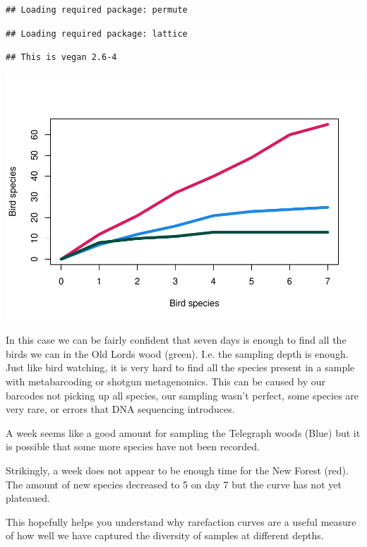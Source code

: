\documentclass[
]{book}
\begin{document}
\begin{verbatim}
## Loading required package: permute
\end{verbatim}

\begin{verbatim}
## Loading required package: lattice
\end{verbatim}

\begin{verbatim}
## This is vegan 2.6-4
\end{verbatim}

\begin{center}\includegraphics{R-community-analysis_files/figure-latex/unnamed-chunk-101-1} \end{center}

In this case we can be fairly confident that seven days is enough to find all the birds we can in the Old Lords wood (green).
I.e. the sampling depth is enough.
Just like bird watching, it is very hard to find all the species present in a sample with metabarcoding or shotgun metagenomics.
This can be caused by our barcodes not picking up all species, our sampling wasn't perfect, some species are very rare, or errors that DNA sequencing introduces.

A week seems like a good amount for sampling the Telegraph woods (Blue) but it is possible that some more species have not been recorded.

Strikingly, a week does not appear to be enough time for the New Forest (red). The amount of new species decreased to 5 on day 7 but the curve has not yet plateaued.

This hopefully helps you understand why rarefaction curves are a useful measure of how well we have captured the diversity of samples at different depths.
\end{document}

